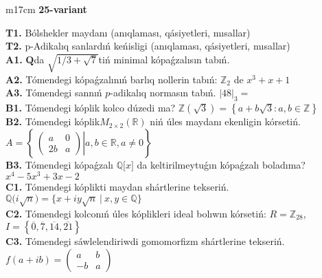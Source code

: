 \documentclass{article}
\begin{document}
\begin{tabular}{m{17cm}}
\textbf{25-variant}
\newline

\textbf{T1.} Bólshekler maydanı (anıqlaması, qásiyetleri, mısallar) \\
\textbf{T2.} p-Adikalıq sanlardıń keńisligi (anıqlaması, qásiyetleri, mısallar) \\
\textbf{A1.} \(\mathbf{Q}\)da \(\sqrt{1/3 + \sqrt{7}}\)tiń minimal kópaǵzalısın tabıń. \\
\textbf{A2.} Tómendegi kópaǵzalınıń barlıq nollerin tabıń: \(\mathbb{Z}_{2}\) de \(x^{3} + x + 1\) \\
\textbf{A3.} Tómendegi sannıń \(p\)-adikalıq normasın tabıń. \(|48|_{3} =\) \\
\textbf{B1.} Tómendegi kóplik kolco dúzedi ma? \(\mathbb{Z}\left( \sqrt{3} \right) = \left\{ a + b\sqrt{3}:a,b \in \mathbb{Z} \right\}\) \\
\textbf{B2.} Tómendegi kóplik\(M_{2 \times 2}\left( \mathbb{R} \right)\) niń úles maydanı ekenligin kórsetiń. \(A = \left\{ \left. \ \begin{pmatrix}
a & 0 \\
2b & a
\end{pmatrix} \right|a,b\mathbb{\in R},a \neq 0 \right\}\) \\
\textbf{B3.} Tómendegi kópaǵzalı \(\mathbb{Q\lbrack}x\rbrack\) da keltirilmeytuǵın kópaǵzalı boladıma? \(x^{4} - 5x^{3} + 3x - 2\) \\
\textbf{C1.} Tómendegi kóplikti maydan shártlerine tekseriń. \(\mathbb{Q(}i\sqrt{n}) = \{ x + iy\sqrt{n}\ |\ x,y \in \mathbb{Q}\}\) \\
\textbf{C2.} Tómendegi kolconıń úles kóplikleri ideal bolıwın kórsetiń:
\(R = \mathbb{Z}_{28}\), \(I = \left\{ \overline{0},\overline{7},\overline{14},\overline{21} \right\}\) \\
\textbf{C3.} Tómendegi sáwlelendiriwdi gomomorfizm shártlerine tekseriń. \(f(a + ib) = \begin{pmatrix}
a & b \\
 - b & a
\end{pmatrix}\) \\

\end{tabular}
\vspace{1cm}
\end{document}
